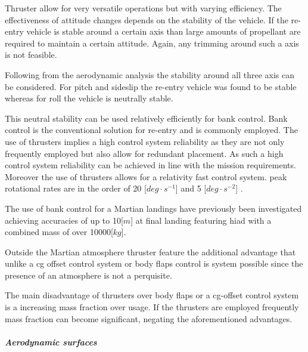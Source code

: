 Thruster allow for very versatile operations but with varying efficiency. The effectiveness of attitude changes depends on the stability of the vehicle. If the re-entry vehicle is stable around a certain axis than large amounts of propellant are required to maintain a certain attitude. Again, any trimming around such a axis is not feasible.

Following from the aerodynamic analysis the stability around all three axis can be considered. For pitch and sideslip the re-entry vehicle was found to be stable whereas for roll the vehicle is neutrally stable. 

This neutral stability can be used relatively efficiently for bank control. Bank control is the conventional solution for re-entry and is commonly employed. The use of thrusters implies a high control system reliability \cite{Wertz2011} as they are not only frequently employed but also allow for redundant placement. As such a high control system reliability can be achieved in line with the mission requirements. Moreover the use of thrusters allows for a relativity fast control system. peak rotational rates are in the order of 20 [$deg\cdot s^{-1}$] and 5 [$deg \cdot s^{-2}$] \cite{Davis2010}.

The use of bank control for a Martian landings have previously been investigated \cite{Davis2010} achieving accuracies of up to 10[$m$] at final landing featuring \gls{hiad} with a combined mass of over 10000[$kg$].

Outside the Martian atmosphere thruster feature the additional advantage that unlike a \gls{cg} offset control system or body flaps control is system possible since the presence of an atmosphere is not a perquisite.

The main disadvantage of thrusters over body flaps or a \gls{cg}-offset control system is a increasing mass fraction over usage. If the thrusters are employed frequently mass fraction can become significant, negating the aforementioned advantages.


\subparagraph{Aerodynamic surfaces}

